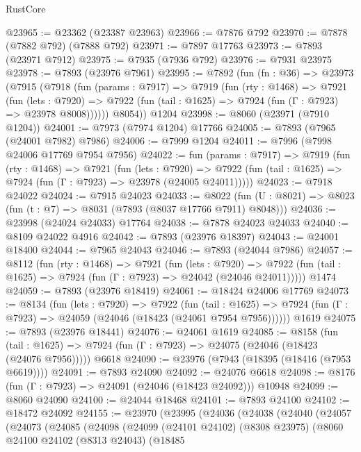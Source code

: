 \begin{lexlean}{RustCore}
\begin{coremodule}
@23965 := @23362 (@23387 @23963)
@23966 := @7876 @792
@23970 := @7878 (@7882 @792) (@7888 @792)
@23971 := @7897 @17763
@23973 := @7893 (@23971 @7912)
@23975 := @7935 (@7936 @792)
@23976 := @7931 @23975
@23978 := @7893 (@23976 @7961)
@23995 := @7892
    (fun (fn : @36) =>
    @23973
      (@7915
        (@7918
          (fun (params : @7917) =>
          @7919
            (fun (rty : @1468) =>
            @7921
              (fun (lets : @7920) =>
              @7922 (fun (tail : @1625) => @7924 (fun (Γ : @7923) => @23978 @8008))))))
        @8054))
    @1204
@23998 := @8060 (@23971 (@7910 @1204))
@24001 := @7973 (@7974 @1204) @17766
@24005 := @7893 (@7965 (@24001 @7982) @7986)
@24006 := @7999 @1204
@24011 := @7996 (@7998 @24006 @17769 @7954 @7956)
@24022 := fun (params : @7917) =>
  @7919
    (fun (rty : @1468) =>
    @7921
      (fun (lets : @7920) =>
      @7922 (fun (tail : @1625) => @7924 (fun (Γ : @7923) => @23978 (@24005 @24011)))))
@24023 := @7918 @24022
@24024 := @7915 @24023
@24033 := @8022
    (fun (U : @8021) => @8023 (fun (t : @7) => @8031 (@7893 (@8037 @17766 @7911) @8048)))
@24036 := @23998 (@24024 @24033) @17764
@24038 := @7878 @24023 @24033
@24040 := @8109 @24022 @4916
@24042 := @7893 (@23976 @18397)
@24043 := @24001 @18400
@24044 := @7965 @24043
@24046 := @7893 (@24044 @7986)
@24057 := @8112
    (fun (rty : @1468) =>
    @7921
      (fun (lets : @7920) =>
      @7922 (fun (tail : @1625) => @7924 (fun (Γ : @7923) => @24042 (@24046 @24011)))))
    @1474
@24059 := @7893 (@23976 @18419)
@24061 := @18424 @24006 @17769
@24073 := @8134
    (fun (lets : @7920) =>
    @7922
      (fun (tail : @1625) =>
      @7924 (fun (Γ : @7923) => @24059 (@24046 (@18423 (@24061 @7954 @7956))))))
    @1619
@24075 := @7893 (@23976 @18441)
@24076 := @24061 @1619
@24085 := @8158
    (fun (tail : @1625) => @7924 (fun (Γ : @7923) => @24075 (@24046 (@18423 (@24076 @7956)))))
    @6618
@24090 := @23976 (@7943 (@18395 (@18416 (@7953 @6619))))
@24091 := @7893 @24090
@24092 := @24076 @6618
@24098 := @8176 (fun (Γ : @7923) => @24091 (@24046 (@18423 @24092))) @10948
@24099 := @8060 @24090
@24100 := @24044 @18468
@24101 := @7893 @24100
@24102 := @18472 @24092
@24155 := @23970
    (@23995
      (@24036
        (@24038
          (@24040
            (@24057
              (@24073
                (@24085
                  (@24098
                    (@24099
                      (@24101 @24102)
                      (@8308 @23975)
                      (@8060
                        @24100
                        @24102
                        (@8313 @24043)
                        (@18485

\end{coremodule}
\end{lexlean}
